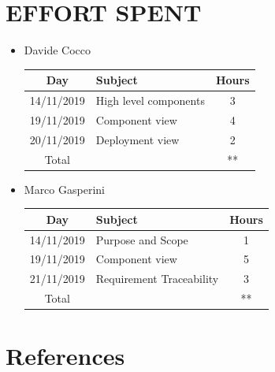 \documentclass[12pt,a4paper]{article}
\begin{document}
\section{EFFORT SPENT}
\begin{itemize}
\item {Davide Cocco}
 \begin{center}
			\begin{tabular}{| c | l | c |}
				\hline
				\textbf{Day} & \textbf{Subject} & \textbf{Hours} \\ \hline
				14/11/2019 & High level components & 3 \\ \hline
				19/11/2019 & Component view & 4 \\ \hline
				20/11/2019 & Deployment view & 2 \\ \hline
				Total & & ** \\ \hline
			\end{tabular}
		\end{center}
\item {Marco Gasperini}
\begin{center}
			\begin{tabular}{| c | l | c |}
				\hline
				\textbf{Day} & \textbf{Subject} & \textbf{Hours} \\ \hline
				14/11/2019 & Purpose and Scope & 1 \\ \hline
				19/11/2019 & Component view & 5 \\ \hline
				21/11/2019 & Requirement Traceability & 3 \\ \hline
				Total & & ** \\ \hline
			\end{tabular}
\end{center}
\end{itemize}
\section{References}
\end{document}
